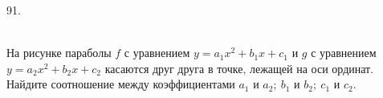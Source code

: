 91. \begin{figure}[ht!]
\end{figure}\\
На рисунке параболы $f$ с уравнением $y=a_1 x^2+b_1x+c_1$ и $g$ с уравнением $y=a_2 x^2+b_2x+c_2$ касаются друг друга в точке, лежащей на оси ординат. Найдите соотношение между коэффициентами $a_1$ и $a_2;\ b_1$ и $b_2;\ c_1$ и $c_2.$\\
